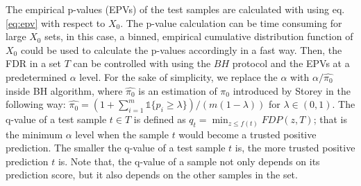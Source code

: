 \documentclass{article}
\newcommand{\mathone}{\mathds{1}}
\begin{document}
The empirical  p-values (EPVs) of the test samples are calculated with using eq. \ref{eq:epv} with respect to $X_0$. The p-value calculation can be time consuming for large $X_0$ sets, in this case, a binned, empirical cumulative distribution function of $X_0$ could be used to calculate the p-values accordingly in a fast way. Then, the FDR in a set $T$ can be controlled with using the $BH$ protocol and the EPVs at a predetermined $\alpha$ level. For the sake of simplicity, we replace the $\alpha$ with $\alpha/\hat{\pi_0}$ inside BH algorithm, where $\hat{\pi_0}$ is an estimation of $\pi_0$ introduced by Storey \cite{storey2004strong} in the following way: $\hat{\pi_0} = (1+\sum_{i=1}^m \mathone\{p_i\ge\lambda\} )/(m(1-\lambda))$ for $\lambda\in (0,1)$. The q-value of a test sample $t\in T$ is defined as $q_t=\min_{z\le f(t)}FDP( z, T )$; that is the minimum $\alpha$ level when the sample $t$ would become a trusted positive prediction. %
The smaller the q-value of a test sample $t$ is, the more trusted positive prediction $t$ is. Note that, the q-value of a sample not only depends on its prediction score, but it also depends on the other samples in the set. 
%
\end{document}
